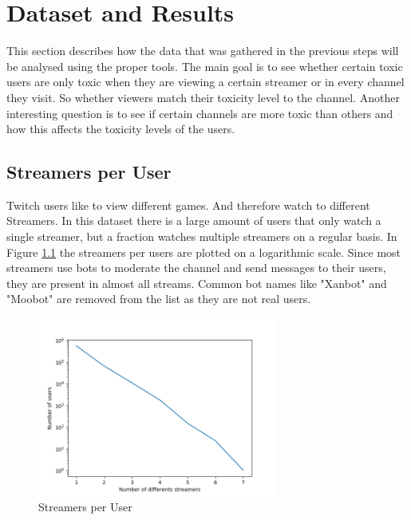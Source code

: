 \documentclass[final]{report}
\begin{document}
\chapter{Dataset and Results}
\label{ch:dataset}

This section describes how the data that was gathered in the previous steps will be analysed using the proper tools. The main goal is to see whether certain toxic users are only toxic when they are viewing a certain streamer or in every channel they visit. So whether viewers match their toxicity level to the channel. Another interesting question is to see if certain channels are more toxic than others and how this affects the toxicity levels of the users. 

\section{Streamers per User}
Twitch users like to view different games. And therefore watch to different Streamers. In this dataset there is a large amount of users that only watch a single streamer, but a fraction watches multiple streamers on a regular basis. In Figure \ref{fig:streamPerUser} the streamers per users are plotted on a logarithmic scale. Since most streamers use bots to moderate the channel and send messages to their users, they are present in almost all streams. Common bot names like "Xanbot" and "Moobot" are removed from the list as they are not real users. \\

\begin{figure}[h]
	\centering
	\includegraphics[width=0.7\textwidth]{StreamersPerUser.png}
	\caption{Streamers per User}
	\label{fig:streamPerUser}
\end{figure}
\end{document}
